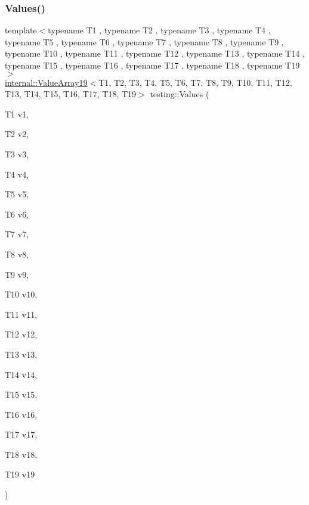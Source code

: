 \subsubsection{\texorpdfstring{Values()}{Values()}\hspace{0.1cm}{\footnotesize\ttfamily [19/50]}}
{\footnotesize\ttfamily template$<$typename T1 , typename T2 , typename T3 , typename T4 , typename T5 , typename T6 , typename T7 , typename T8 , typename T9 , typename T10 , typename T11 , typename T12 , typename T13 , typename T14 , typename T15 , typename T16 , typename T17 , typename T18 , typename T19 $>$ \\
\mbox{\hyperlink{classtesting_1_1internal_1_1ValueArray19}{internal\+::\+Value\+Array19}}$<$T1, T2, T3, T4, T5, T6, T7, T8, T9, T10, T11, T12, T13, T14, T15, T16, T17, T18, T19$>$ testing\+::\+Values (\begin{DoxyParamCaption}\item[{T1}]{v1,  }\item[{T2}]{v2,  }\item[{T3}]{v3,  }\item[{T4}]{v4,  }\item[{T5}]{v5,  }\item[{T6}]{v6,  }\item[{T7}]{v7,  }\item[{T8}]{v8,  }\item[{T9}]{v9,  }\item[{T10}]{v10,  }\item[{T11}]{v11,  }\item[{T12}]{v12,  }\item[{T13}]{v13,  }\item[{T14}]{v14,  }\item[{T15}]{v15,  }\item[{T16}]{v16,  }\item[{T17}]{v17,  }\item[{T18}]{v18,  }\item[{T19}]{v19 }\end{DoxyParamCaption})}

\mbox{\label{namespacetesting_aedd2f90dfb3c42dce713ba0b89cde96c}} 
